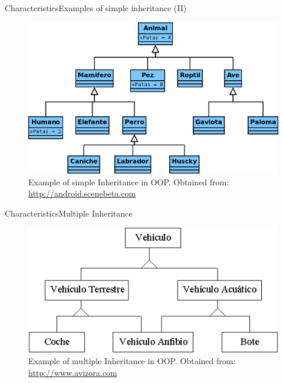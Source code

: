 \documentclass[10pt,compress]{beamer} %
\begin{document}
\begin{frame}{Characteristics}{Examples of simple inheritance (II)}
	\begin{figure}
		\includegraphics[scale=0.33]{figs/herencia1}
		\caption{{\scriptsize Example of simple Inheritance in OOP. Obtained from: \url{http://android.scenebeta.com}}}
	\end{figure}
\end{frame}



\begin{frame}{Characteristics}{Multiple Inheritance}
	\begin{figure}
		\includegraphics[scale=0.5]{figs/herencia2}
		\caption{{\scriptsize Example of multiple Inheritance in OOP. Obtained from: \url{http://www.avizora.com}}}
	\end{figure}
\end{frame}
\end{document}
